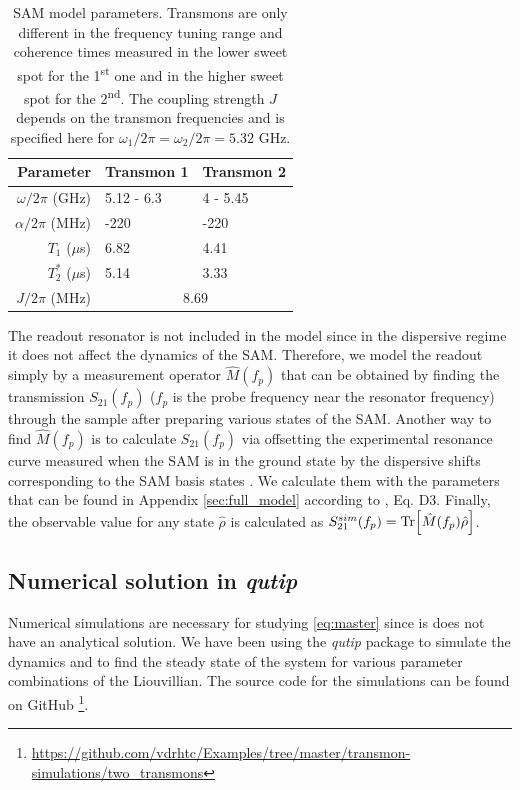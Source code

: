 \documentclass[%
 aps, prx,
 amsmath,amssymb,
 reprint,%
superscriptaddress
]{revtex4-2}
\begin{document}
\begin{table}
	\begin{ruledtabular}
		\begin{tabular}{rll}
			Parameter & Transmon 1  & Transmon 2\\\hline
			$\omega/2\pi$ (GHz) & 5.12 - 6.3  & 4 - 5.45\\
			$\alpha/2\pi$ (MHz) & -220 & -220 \\
			$T_1$ ($\mu$s)  & 6.82 &  4.41 \\
			$T_2^*$ ($\mu$s)  & 5.14  &  3.33\\\hline
			$J/2\pi$ (MHz) &\multicolumn{2}{c}{8.69} 
		\end{tabular}
	\end{ruledtabular}
	\caption{SAM model parameters. Transmons are only 
		different in the frequency tuning range and 
		coherence times measured in the lower sweet 
		spot for the 1\textsuperscript{st} one and in 
		the higher sweet spot for the 
		2\textsuperscript{nd}. The coupling strength 
		$J$ depends on the transmon frequencies and 
		is specified here for $\omega_1/2\pi = 
		\omega_2/2\pi = 5.32$ GHz.}
	\label{tab:parameters}
\end{table}	

The readout resonator is not included in the 
model since in the dispersive regime it does not 
affect the dynamics of the SAM. Therefore, we model the 
readout simply by a measurement 
operator $\hat M(f_p)$ that can be obtained by 
finding the transmission $S_{21}(f_p)$ ($f_p$ is 
the probe frequency near the resonator frequency) through 
the sample after preparing various states of the 
SAM. Another way to find $\hat M(f_p)$ is to 
calculate $S_{21}(f_p)$ via offsetting the 
experimental resonance curve measured when the 
SAM is in the ground state by the dispersive 
shifts corresponding to the SAM basis 
states \cite{filipp2009two, chow2010detecting}. We calculate them with the parameters that can be found in Appendix \ref{sec:full_model} according to \cite{koch2007charge}, Eq. D3. Finally, the observable value for any state $\hat 
\rho$ is calculated as $S_{21}^{sim}(f_p) = 
\Tr[\hat M(f_p) \hat \rho]$. 

\subsection{Numerical solution in \textit{qutip}}


Numerical simulations are necessary for studying 
\autoref{eq:master} since is does not have an 
analytical solution. We have been using the 
\textit{qutip} \cite{johansson2013qutip} package to simulate the 
dynamics and to find the steady state of the 
system for various parameter combinations of the 
Liouvillian. The source code for the simulations can be found on GitHub \footnote{\url{https://github.com/vdrhtc/Examples/tree/master/transmon-simulations/two_transmons}}. 
\end{document}
